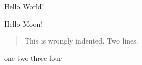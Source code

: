 \documentclass{minimal}
\begin{document}
Hello World!

Hello Moon!

\begin{quote}
    This is wrongly indented.
    Two lines.
\end{quote}

one
two
three
four
\end{document}
